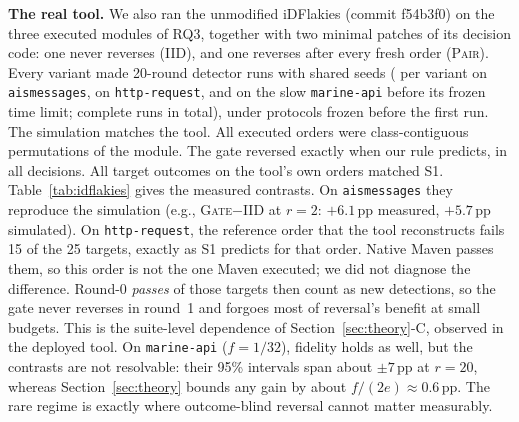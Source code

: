 \documentclass[conference,letterpaper]{IEEEtran}
\theoremstyle{definition}
\newcommand{\pp}{\,pp}
\newcommand{\IIDp}{\textup{\textsc{IID}}}
\newcommand{\PAIRp}{\textup{\textsc{Pair}}}
\newcommand{\GATEp}{\textup{\textsc{Gate}}}
\begin{document}
\textbf{The real tool.} We also ran the unmodified iDFlakies (commit f54b3f0) on the three executed modules of RQ3, together with two minimal patches of its decision code: one never reverses (\IIDp), and one reverses after every fresh order (\PAIRp). Every variant made 20-round detector runs with shared seeds (\IdfRunsAis{} per variant on \texttt{aismessages}, \IdfRunsHttp{} on \texttt{http-request}, and \IdfRunsMarine{} on the slow \texttt{marine-api} before its frozen time limit; \IdfDetectorRuns{} complete runs in total), under protocols frozen before the first run. The simulation matches the tool. All \IdfOrders{} executed orders were class-contiguous permutations of the module. The gate reversed exactly when our rule predicts, in all \IdfGateTransitions{} decisions. All \IdfComparisons{} target outcomes on the tool's own orders matched S1. Table~\ref{tab:idflakies} gives the measured contrasts. On \texttt{aismessages} they reproduce the simulation (e.g., \GATEp$-$\IIDp{} at $r=2$: $+6.1$\pp{} measured, $+5.7$\pp{} simulated). On \texttt{http-request}, the reference order that the tool reconstructs fails 15 of the 25 targets, exactly as S1 predicts for that order. Native Maven passes them, so this order is not the one Maven executed; we did not diagnose the difference. Round-0 \emph{passes} of those targets then count as new detections, so the gate never reverses in round~1 and forgoes most of reversal's benefit at small budgets. This is the suite-level dependence of Section~\ref{sec:theory}-C, observed in the deployed tool. On \texttt{marine-api} ($f=1/32$), fidelity holds as well, but the contrasts are not resolvable: their 95\% intervals span about $\pm7$\pp{} at $r=20$, whereas Section~\ref{sec:theory} bounds any gain by about $f/(2e)\approx0.6$\pp. The rare regime is exactly where outcome-blind reversal cannot matter measurably.

\begin{table}[t]
\caption{Real iDFlakies runs: detection difference in percentage points of the module's targets (KR, computed from per-round target outcomes; mean and 95\% bootstrap CI over paired detector runs; \texttt{marine-api}: \IdfRunsMarine{} pairs, not resolvable).}\label{tab:idflakies}
\centering\small
\setlength{\tabcolsep}{2.5pt}
\end{table}
\end{document}
